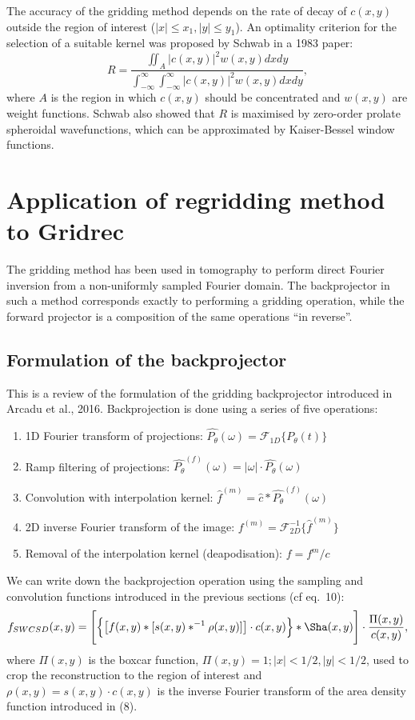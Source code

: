 \documentclass[11pt]{article}
\newcommand\ddfrac[2]{\frac{\displaystyle #1}{\displaystyle #2}}
\begin{document}
The accuracy of the gridding method depends on the rate of decay of $c(x,y)$ outside the region of interest ($|x| \leq x_1, |y| \leq y_1$). An optimality criterion for the selection of a suitable kernel was proposed by Schwab in a 1983 paper:
\begin{equation}
R  = \ddfrac{\iint_A |c(x,y)|^2 w(x,y) dx dy}{\int_{-\infty}^{\infty} \int_{-\infty}^{\infty} |c(x,y)|^2 w(x,y) dx dy},
\end{equation}
where $A$ is the region in which $c(x,y)$ should be concentrated and $w(x,y)$ are weight functions. Schwab also showed that $R$ is maximised by zero-order prolate spheroidal wavefunctions, which can be approximated by Kaiser-Bessel window functions.

\section{Application of regridding method to Gridrec}
The gridding method has been used in tomography to perform direct Fourier inversion from a non-uniformly sampled Fourier domain. The backprojector in such a method corresponds exactly to performing a gridding operation, while the forward projector is a composition of the same operations ``in reverse''.

\subsection{Formulation of the backprojector}
This is a review of the formulation of the gridding backprojector introduced in Arcadu et al., 2016. Backprojection is done using a series of five operations:
\begin{enumerate}
\item 1D Fourier transform of projections: $\hat{P_\theta}(\omega) = \mathcal{F}_{1D}\{P_\theta(t)\}$
\item Ramp filtering of projections: $\hat{P_\theta}^{(f)}(\omega) = |\omega| \cdot \hat{P_\theta}(\omega)$
\item Convolution with interpolation kernel: $\hat{f}^{(m)} = \hat{c} \ast \hat{P_\theta}^{(f)}(\omega)$
\item 2D inverse Fourier transform of the image: $f^{(m)} = \mathcal{F}^{-1}_{2D}\{\hat{f}^{(m)}\}$
\item Removal of the interpolation kernel (deapodisation): $f = f^m/c$
\end{enumerate}

We can write down the backprojection operation using the sampling and convolution functions introduced in the previous sections (cf eq.~10):
\begin{equation}
f_{SWCSD}(x,y) =  \Bigg[\Big\{\big[f(x,y) \ast [s(x,y) \ast^{-1} \rho(x,y)]\big] \cdot c(x,y)\Big\} \ast \Sha(x,y)\Bigg] \cdot \frac{\Pi(x,y)}{c(x,y)},
\end{equation}
where $\Pi(x,y)$ is the boxcar function, $\Pi(x,y) = 1; |x|<1/2,|y|<1/2$, used to crop the reconstruction to the region of interest and $\rho(x,y) = s(x,y) \cdot c(x,y)$ is the inverse Fourier transform of the area density function introduced in (8).
\end{document}
